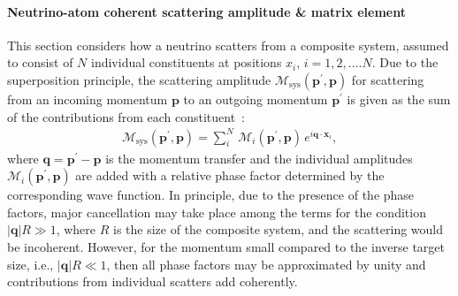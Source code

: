 \paragraph{Neutrino-atom coherent scattering amplitude \& matrix element} 
This section considers how a neutrino scatters from a composite system, assumed to consist of $N$ individual constituents at positions $x_i,\,i=1,2,....N$. Due to the superposition principle, the scattering amplitude $\mathcal{M}_\mathrm{sys}(\mathbf{p}^\prime,\mathbf{p})$ for scattering from an incoming momentum $\mathbf{p}$ to an outgoing momentum $\mathbf{p}^\prime$ is given as the sum of the contributions from each constituent~\cite{Freedman:1977xn,Papavassiliou:2005cs}:
\begin{align}
\mathcal{M}_\mathrm{sys}(\mathbf{p}^\prime,\mathbf{p})=\sum_i^N\,\mathcal{M}_i(\mathbf{p}^\prime,\mathbf{p})\,e^{i\mathbf{q}\cdot\mathbf{x}_i},
\end{align}
where $\mathbf{q}=\mathbf{p}^\prime-\mathbf{p}$ is the momentum transfer and the individual amplitudes $\mathcal{M}_i(\mathbf{p}^\prime,\mathbf{p})$ are added with a relative phase factor determined by the corresponding wave function. %
In principle, due to the presence of the phase factors, major cancellation may take place among the terms for the condition $|\mathbf{q}|R\gg1$, where $R$ is the size of the composite system, and the scattering would be incoherent. However, for the momentum small compared to the inverse target size, i.e., $|\mathbf{q}|R\ll1$, then all phase factors may be approximated by unity and contributions from individual scatters add coherently. 


